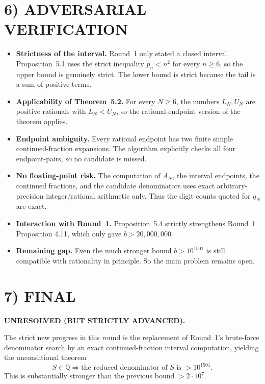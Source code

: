 \section*{6) ADVERSARIAL VERIFICATION}

\begin{itemize}
\item \textbf{Strictness of the interval.} Round~1 only stated a closed interval. Proposition~5.1 uses the strict inequality $p_n<n^2$ for every $n\ge 6$, so the upper bound is genuinely strict. The lower bound is strict because the tail is a sum of positive terms.

\item \textbf{Applicability of Theorem~5.2.} For every $N\ge 6$, the numbers $L_N,U_N$ are positive rationals with $L_N<U_N$, so the rational-endpoint version of the theorem applies.

\item \textbf{Endpoint ambiguity.} Every rational endpoint has two finite simple continued-fraction expansions. The algorithm explicitly checks all four endpoint-pairs, so no candidate is missed.

\item \textbf{No floating-point risk.} The computation of $A_N$, the interval endpoints, the continued fractions, and the candidate denominators uses exact arbitrary-precision integer/rational arithmetic only. Thus the digit counts quoted for $q_N$ are exact.

\item \textbf{Interaction with Round~1.} Proposition~5.4 strictly strengthens Round~1 Proposition 4.11, which only gave $b>20{,}000{,}000$.

\item \textbf{Remaining gap.} Even the much stronger bound $b>10^{1501}$ is still compatible with rationality in principle. So the main problem remains open.
\end{itemize}

\section*{7) FINAL}

\textbf{UNRESOLVED (BUT STRICTLY ADVANCED).}

The strict new progress in this round is the replacement of Round~1's brute-force denominator search by an exact continued-fraction interval computation, yielding the unconditional theorem
\[
S\in\mathbb Q \Longrightarrow \text{the reduced denominator of }S\text{ is }>10^{1501}.
\]
This is substantially stronger than the previous bound $>2\cdot 10^7$.

